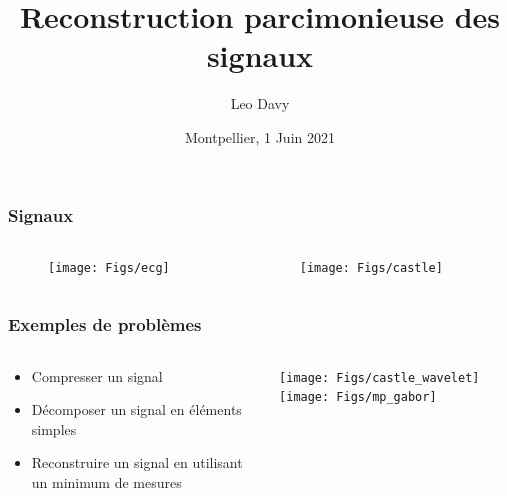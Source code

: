 \documentclass[french]{beamer}
\title[]{Reconstruction parcimonieuse des signaux}
\author[Leo Davy]{Leo Davy}
\institute{Universit\'e de Montpellier}
\date[]{Montpellier, 1 Juin 2021}
\begin{document}
	\frame{\titlepage}

	\begin{frame}
		\frametitle{Signaux}
		\begin{columns}[T]
			\begin{column}{.65\textwidth}
				\begin{figure}
					\texttt{[image: Figs/ecg]}
				\end{figure}
			\end{column}		
			\begin{column}{.3\textwidth}
				\begin{figure}
					\texttt{[image: Figs/castle]}
				\end{figure}
			\end{column}
		\end{columns}
	\end{frame}

	\begin{frame}
		\frametitle{Exemples de problèmes}
		\begin{columns}[T]
			\begin{column}{.35\textwidth}
				\begin{itemize}
					\item Compresser un signal
					\item Décomposer un signal en éléments simples
					\item Reconstruire un signal en utilisant un minimum de mesures
				\end{itemize}
			\end{column}
			\begin{column}{.6\textwidth}
				\vspace*{-3.0cm}\texttt{[image: Figs/castle\_wavelet]}
				\vspace*{-5.0cm}\hspace*{1.0cm}\texttt{[image: Figs/mp\_gabor]}
			\end{column}
		\end{columns}
	\end{frame}
\end{document}
